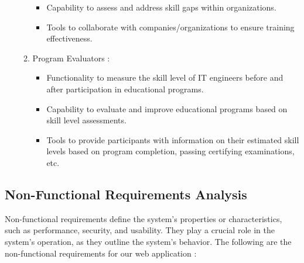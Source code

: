 \begin{enumerate}
\begin{enumerate}
\begin{itemize}
          \item Capability to assess and address skill gaps within organizations.
          \item Tools to collaborate with companies/organizations to ensure training effectiveness.
        \end{itemize}
        \item Program Evaluators : \\
        \begin{itemize}
          \renewcommand\labelitemi{-}
          \item Functionality to measure the skill level of IT engineers before and after participation in educational programs.
          \item Capability to evaluate and improve educational programs based on skill level assessments.
          \item Tools to provide participants with information on their estimated skill levels based on program completion, passing certifying examinations, etc.
        \end{itemize}
    \end{enumerate}

\end{enumerate}

\subsection{Non-Functional Requirements Analysis}
Non-functional requirements define the system's properties or characteristics, such as performance, security, and usability. They play a crucial role in the system's operation, as they outline the system's behavior. The following are the non-functional requirements for our web application :

